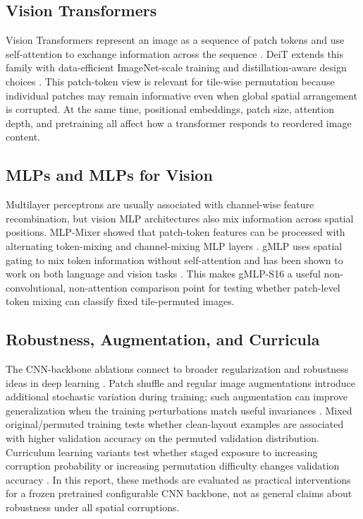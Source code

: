 \documentclass[12pt]{article}
\begin{document}
\subsection{Vision Transformers}

Vision Transformers represent an image as a sequence of patch tokens and use self-attention to exchange information across the sequence \citep{dosovitskiy2021image}. DeiT extends this family with data-efficient ImageNet-scale training and distillation-aware design choices \citep{touvron2021deit}. This patch-token view is relevant for tile-wise permutation because individual patches may remain informative even when global spatial arrangement is corrupted. At the same time, positional embeddings, patch size, attention depth, and pretraining all affect how a transformer responds to reordered image content.

\subsection{MLPs and MLPs for Vision}

Multilayer perceptrons are usually associated with channel-wise feature recombination, but vision MLP architectures also mix information across spatial positions. MLP-Mixer showed that patch-token features can be processed with alternating token-mixing and channel-mixing MLP layers \citep{tolstikhin2021mlp}. gMLP uses spatial gating to mix token information without self-attention and has been shown to work on both language and vision tasks \citep{liu2021pay}. This makes gMLP-S16 a useful non-convolutional, non-attention comparison point for testing whether patch-level token mixing can classify fixed tile-permuted images.

\subsection{Robustness, Augmentation, and Curricula}

The CNN-backbone ablations connect to broader regularization and robustness ideas in deep learning \citep{goodfellow2016deep}. Patch shuffle and regular image augmentations introduce additional stochastic variation during training; such augmentation can improve generalization when the training perturbations match useful invariances \citep{shorten2019survey}. Mixed original/permuted training tests whether clean-layout examples are associated with higher validation accuracy on the permuted validation distribution. Curriculum learning variants test whether staged exposure to increasing corruption probability or increasing permutation difficulty changes validation accuracy \citep{bengio2009curriculum}. In this report, these methods are evaluated as practical interventions for a frozen pretrained configurable CNN backbone, not as general claims about robustness under all spatial corruptions.
\end{document}
